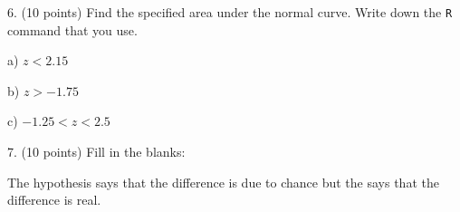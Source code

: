 \documentclass[10pt]{article}
\begin{document}
\vfill
\eject


6. (10 points) Find the specified area under the normal curve.  Write down the \texttt{R} command that you use.

\hspace{10pt} a) $z<2.15$ 
\bigskip
\bigskip\bigskip\bigskip

\hspace{10pt} b) $z>-1.75$
\bigskip
\bigskip\bigskip\bigskip

\hspace{10pt} c) $-1.25 < z < 2.5$
\bigskip\bigskip\bigskip\bigskip


7. (10 points)  
Fill in the blanks: 

The \underline{\hspace{60pt}} hypothesis says that the difference is due to chance
but the \underline{\hspace{60pt}} says that the difference is real.  
\vfill
\end{document}
